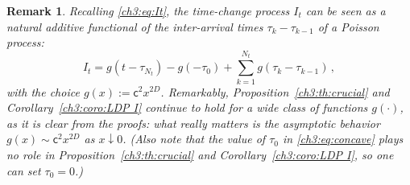 \documentclass[a4paper,reqno,11pt]{amsart}
\numberwithin{equation}{section}
\newtheorem{remark}[theorem]{Remark}
\newcommand\sfc{\mathsf{c}}
\begin{document}
\begin{remark}\label{ch3:rem:LD}\rm
Recalling \eqref{ch3:eq:It}, the time-change process $I_t$ can be seen as
a natural additive functional of the inter-arrival times
$\tau_k - \tau_{k-1}$ of a Poisson process:
\begin{equation} \label{ch3:eq:concave}
	I_t = g(t-\tau_{N_t}) - g(-\tau_0) + \sum_{k=1}^{N_t} g(\tau_k - \tau_{k-1})  \,,
\end{equation}
with the choice $g(x) := \sfc^2 x^{2D}$.
Remarkably, Proposition~\ref{ch3:th:crucial} 
and Corollary~\ref{ch3:coro:LDP I} continue to hold
for a \emph{wide class of functions $g(\cdot)$}, as it is clear from the proofs:
what really matters is the asymptotic behavior $g(x) \sim \sfc^2 x^{2D}$
as $x \downarrow 0$.
(Also note that the value of $\tau_0$ in \eqref{ch3:eq:concave} plays no role
in Proposition~\ref{ch3:th:crucial} 
and Corollary~\ref{ch3:coro:LDP I}, so one can set $\tau_0 = 0$.)
\end{remark}
\end{document}
